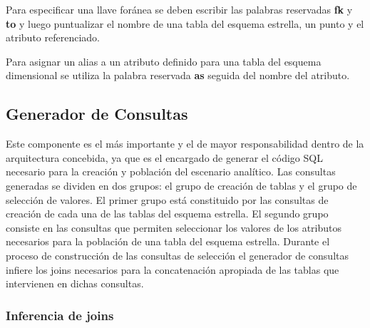 Para especificar una llave for\'anea se deben escribir las palabras reservadas \textbf{fk} y \textbf{to} y luego puntualizar 
el nombre de una tabla del esquema estrella, un punto y el atributo referenciado.

Para asignar un alias a un atributo definido para una tabla del esquema dimensional se utiliza la 
palabra reservada \textbf{as} seguida del nombre del atributo.


\subsection{Generador de Consultas}

Este componente es el m\'as importante y el de mayor responsabilidad dentro de la arquitectura concebida, ya que es el 
encargado 
de generar el código SQL necesario para la creación y población del escenario analítico. Las consultas generadas 
se dividen en dos grupos: el grupo de creación de tablas y el grupo de selección de valores. El primer grupo 
está constituido por las consultas de creación de cada una de las tablas del esquema estrella. El segundo grupo 
consiste en las  consultas 
que permiten seleccionar los valores de los atributos necesarios para la población de una tabla del esquema estrella. 
Durante el proceso de construcción de las consultas de selección el generador de consultas infiere los joins 
necesarios para la concatenación apropiada de las tablas que intervienen en dichas consultas.

\subsubsection{Inferencia de joins}

